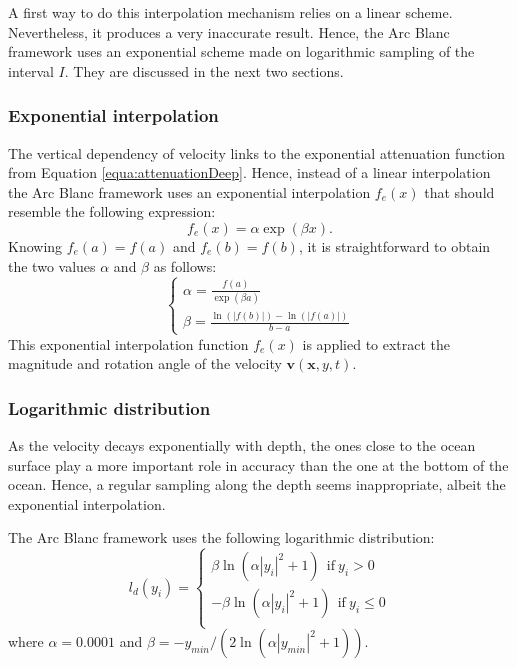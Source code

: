 \documentclass[final]{jcgt}
\def\Framework{The Arc Blanc framework\xspace}
\def\framework{the Arc Blanc framework\xspace}
\begin{document}
A first way to do this interpolation mechanism relies on a linear scheme.
Nevertheless, it produces a very inaccurate result.
Hence, \framework uses an exponential scheme made on logarithmic sampling of the interval $I$.
They are discussed in the next two sections.

\subsubsection{Exponential interpolation}
The vertical dependency of velocity links to the exponential attenuation function from Equation \ref{equa:attenuationDeep}.
Hence, instead of a linear interpolation \framework uses an exponential interpolation $f_e(x)$ that should resemble the following expression:
\begin{equation}
	f_e(x)=\alpha \exp(\beta x).
\end{equation}
Knowing $f_e(a)=f(a)$ and $f_e(b)=f(b)$, it is straightforward to obtain the two values $\alpha$ and $\beta$ as follows:
\begin{equation}
	\begin{cases}
		\displaystyle\alpha = \frac{f(a)}{\exp(\beta a)} \\
		\displaystyle\beta = \frac{\ln(|f(b)|) - \ln(|f(a)|)}{b - a}
	\end{cases}
\end{equation}
This exponential interpolation function $f_e(x)$ is applied to extract the magnitude and rotation angle of the velocity $\mathbf v(\mathbf x,y,t)$.

\subsubsection{Logarithmic distribution}
As the velocity decays exponentially with depth, the ones close to the ocean surface play a more important role in accuracy than the one at the bottom of the ocean.
Hence, a regular sampling along the depth seems inappropriate, albeit the exponential interpolation.

\Framework uses the following logarithmic distribution:
\begin{equation}
	l_d(y_i) =
	\begin{cases}
		\beta \ln(\alpha|y_i|^2+1) ~~\text{if}~y_i>0     \\
		-\beta \ln(\alpha|y_i|^2+1) ~~\text{if}~y_i\leq0 \\
	\end{cases}
\end{equation}
where $\alpha=0.0001$ and $\beta = -y_{min}/\left(2 \ln(\alpha |y_{min}|^2 + 1)\right)$.
\end{document}
